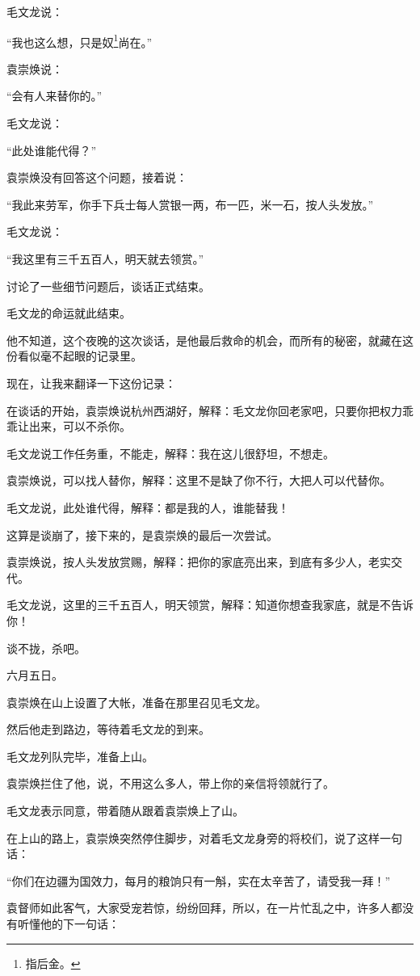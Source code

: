 \begin{multicols}{\theparacolNo}
毛文龙说：

“我也这么想，只是奴\footnote{指后金。}尚在。”

袁崇焕说：

“会有人来替你的。”

毛文龙说：

“此处谁能代得？”

袁崇焕没有回答这个问题，接着说：

“我此来劳军，你手下兵士每人赏银一两，布一匹，米一石，按人头发放。”

毛文龙说：

“我这里有三千五百人，明天就去领赏。”

讨论了一些细节问题后，谈话正式结束。

毛文龙的命运就此结束。

他不知道，这个夜晚的这次谈话，是他最后救命的机会，而所有的秘密，就藏在这份看似毫不起眼的记录里。

现在，让我来翻译一下这份记录：

在谈话的开始，袁崇焕说杭州西湖好，解释：毛文龙你回老家吧，只要你把权力乖乖让出来，可以不杀你。

毛文龙说工作任务重，不能走，解释：我在这儿很舒坦，不想走。

袁崇焕说，可以找人替你，解释：这里不是缺了你不行，大把人可以代替你。

毛文龙说，此处谁代得，解释：都是我的人，谁能替我！

这算是谈崩了，接下来的，是袁崇焕的最后一次尝试。

袁崇焕说，按人头发放赏赐，解释：把你的家底亮出来，到底有多少人，老实交代。

毛文龙说，这里的三千五百人，明天领赏，解释：知道你想查我家底，就是不告诉你！

谈不拢，杀吧。

六月五日。

袁崇焕在山上设置了大帐，准备在那里召见毛文龙。

然后他走到路边，等待着毛文龙的到来。

毛文龙列队完毕，准备上山。

袁崇焕拦住了他，说，不用这么多人，带上你的亲信将领就行了。

毛文龙表示同意，带着随从跟着袁崇焕上了山。

在上山的路上，袁崇焕突然停住脚步，对着毛文龙身旁的将校们，说了这样一句话：

“你们在边疆为国效力，每月的粮饷只有一斛，实在太辛苦了，请受我一拜！”

袁督师如此客气，大家受宠若惊，纷纷回拜，所以，在一片忙乱之中，许多人都没有听懂他的下一句话：


\end{multicols}
